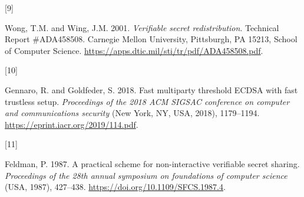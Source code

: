 \documentclass[
]{article}
\newlength{\cslhangindent}
\newlength{\csllabelwidth}
\newlength{\cslentryspacingunit} %
\newenvironment{CSLReferences}[2] %
 {%
  \setlength{\parindent}{0pt}
  \ifodd #1
  \let\oldpar\par
  \def\par{\hangindent=\cslhangindent\oldpar}
  \fi
  \setlength{\parskip}{#2\cslentryspacingunit}
 }%
 {}
\newcommand{\CSLLeftMargin}[1]{\parbox[t]{\csllabelwidth}{#1}}
\newcommand{\CSLRightInline}[1]{\parbox[t]{\linewidth - \csllabelwidth}{#1}\break}
\begin{document}
\begin{CSLReferences}{0}{0}
\leavevmode{}%
\CSLLeftMargin{{[}9{]} }%
\CSLRightInline{Wong, T.M. and Wing, J.M. 2001. \emph{Verifiable secret
redistribution}. Technical Report \#ADA458508. Carnegie Mellon
University, Pittsburgh, PA 15213, School of Computer Science.
\url{https://apps.dtic.mil/sti/tr/pdf/ADA458508.pdf}.}

\leavevmode{}%
\CSLLeftMargin{{[}10{]} }%
\CSLRightInline{Gennaro, R. and Goldfeder, S. 2018. Fast multiparty
threshold ECDSA with fast trustless setup. \emph{Proceedings of the 2018
ACM SIGSAC conference on computer and communications security} (New
York, NY, USA, 2018), 1179--1194.
\url{https://eprint.iacr.org/2019/114.pdf}.}

\leavevmode{}%
\CSLLeftMargin{{[}11{]} }%
\CSLRightInline{Feldman, P. 1987. A practical scheme for non-interactive
verifiable secret sharing. \emph{Proceedings of the 28th annual
symposium on foundations of computer science} (USA, 1987), 427--438.
\url{https://doi.org/10.1109/SFCS.1987.4}.}

\end{CSLReferences}
\end{document}
